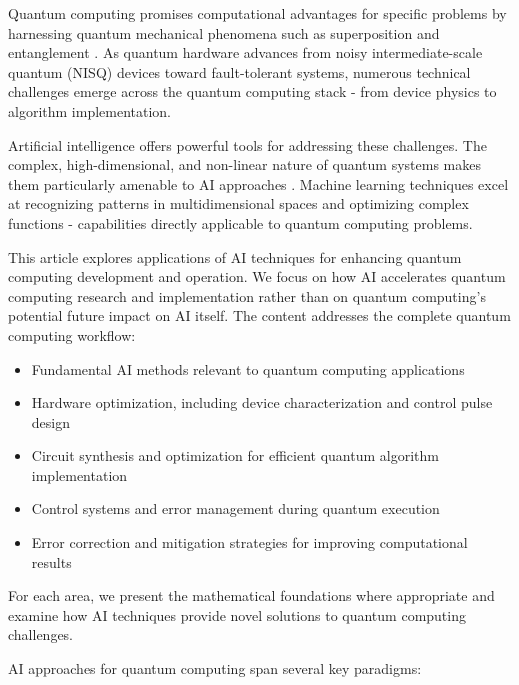 Quantum computing promises computational advantages for specific problems by harnessing quantum mechanical phenomena such as superposition and entanglement \cite{alexeev2021quantum}. As quantum hardware advances from noisy intermediate-scale quantum (NISQ) devices toward fault-tolerant systems, numerous technical challenges emerge across the quantum computing stack - from device physics to algorithm implementation.

Artificial intelligence offers powerful tools for addressing these challenges. The complex, high-dimensional, and non-linear nature of quantum systems makes them particularly amenable to AI approaches \cite{dunjko2023artificial}. Machine learning techniques excel at recognizing patterns in multidimensional spaces and optimizing complex functions - capabilities directly applicable to quantum computing problems.

This article explores applications of AI techniques for enhancing quantum computing development and operation. We focus on how AI accelerates quantum computing research and implementation rather than on quantum computing's potential future impact on AI itself. The content addresses the complete quantum computing workflow:

\begin{itemize}
    \item Fundamental AI methods relevant to quantum computing applications
    \item Hardware optimization, including device characterization and control pulse design
    \item Circuit synthesis and optimization for efficient quantum algorithm implementation
    \item Control systems and error management during quantum execution
    \item Error correction and mitigation strategies for improving computational results
\end{itemize}

For each area, we present the mathematical foundations where appropriate and examine how AI techniques provide novel solutions to quantum computing challenges.

AI approaches for quantum computing span several key paradigms:

